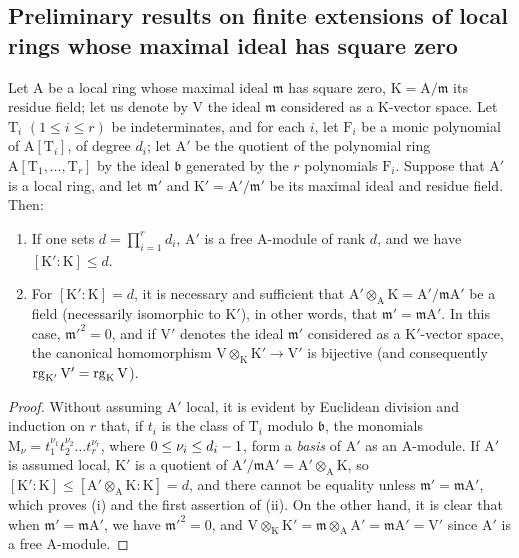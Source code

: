 \subsection{Preliminary results on finite extensions of local rings whose maximal ideal has square zero}
\label{subsection:0.22.4}
\label{0.22.4}

\begin{proposition}[22.4.1]
\label{0.22.4.1}
Let $\mathrm{A}$ be a local ring whose maximal ideal $\mathfrak{m}$ has square zero, $\mathrm{K}=\mathrm{A}/\mathfrak{m}$ its residue field; let us denote by $\mathrm{V}$ the ideal $\mathfrak{m}$ considered as a $\mathrm{K}$-vector space.
Let $\mathrm{T}_i$ $(1\leq i\leq r)$ be indeterminates, and for each $i$, let $\mathrm{F}_i$ be a monic polynomial of $\mathrm{A}[\mathrm{T}_i]$, of degree $d_i$; let $\mathrm{A}'$ be the quotient of the polynomial ring $\mathrm{A}[\mathrm{T}_1,\ldots,\mathrm{T}_r]$ by the ideal $\mathfrak{b}$ generated by the $r$ polynomials $\mathrm{F}_i$.
Suppose that $\mathrm{A}'$ is a local ring, and let $\mathfrak{m}'$ and $\mathrm{K}'=\mathrm{A}'/\mathfrak{m}'$ be its maximal ideal and residue field.
Then:
\begin{enumerate}
  \item[\rm{(i)}] If one sets $d=\prod_{i=1}^r d_i$, $\mathrm{A}'$ is a free $\mathrm{A}$-module of rank $d$, and we have $[\mathrm{K}':\mathrm{K}]\leq d$.
  \item[\rm{(ii)}] For $[\mathrm{K}':\mathrm{K}]=d$, it is necessary and sufficient that $\mathrm{A}'\otimes_\mathrm{A}\mathrm{K}=\mathrm{A}'/\mathfrak{m}\mathrm{A}'$ be a field (necessarily isomorphic to $\mathrm{K}'$), in other words, that $\mathfrak{m}'=\mathfrak{m}\mathrm{A}'$.
  In this case, $\mathfrak{m}'^2=0$, and if $\mathrm{V}'$ denotes the ideal $\mathfrak{m}'$ considered as a $\mathrm{K}'$-vector space, the canonical homomorphism $\mathrm{V}\otimes_\mathrm{K}\mathrm{K}'\to\mathrm{V}'$ is bijective (and consequently $\operatorname{rg}_{\mathrm{K}'}\mathrm{V}'=\operatorname{rg}_\mathrm{K}\mathrm{V}$).
\end{enumerate}
\end{proposition}

\begin{proof}
Without assuming $\mathrm{A}'$ local, it is evident by Euclidean division and induction on $r$ that, if $t_i$ is the class of $\mathrm{T}_i$ modulo $\mathfrak{b}$, the monomials $\mathrm{M}_\nu=t_1^{\nu_1}t_2^{\nu_2}\ldots t_r^{\nu_r}$, where $0\leq\nu_i\leq d_i- 1$, form a \emph{basis} of $\mathrm{A}'$ as an $\mathrm{A}$-module.
If $\mathrm{A}'$ is assumed local, $\mathrm{K}'$ is a quotient of $\mathrm{A}'/\mathfrak{m}\mathrm{A}'=\mathrm{A}'\otimes_\mathrm{A}\mathrm{K}$, so $[\mathrm{K}':\mathrm{K}]\leq[\mathrm{A}'\otimes_\mathrm{A}\mathrm{K}:\mathrm{K}]=d$, and there cannot be equality unless $\mathfrak{m}'=\mathfrak{m}\mathrm{A}'$, which proves (i) and the first assertion of (ii).
On the other hand, it is clear that when $\mathfrak{m}'=\mathfrak{m}\mathrm{A}'$, we have $\mathfrak{m}'^2=0$, and $\mathrm{V}\otimes_\mathrm{K}\mathrm{K}'=\mathfrak{m}\otimes_\mathrm{A}\mathrm{A}'=\mathfrak{m}\mathrm{A}'=\mathrm{V}'$ since $\mathrm{A}'$ is a free $\mathrm{A}$-module.
\end{proof}

